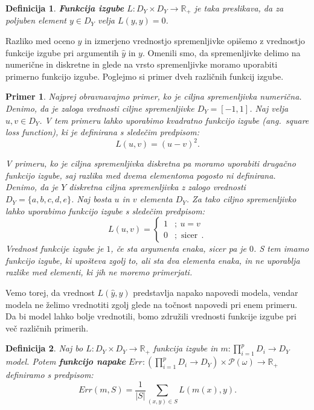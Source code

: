 \documentclass[12pt,a4paper]{article}
\newtheorem{definicija}{Definicija}
\newtheorem{primer}{Primer}
\begin{document}
\begin{definicija}
\textbf{Funkcija izgube} $L: D_Y \times D_Y \rightarrow \mathbb{R}_+$ je taka preslikava, da za poljuben element $y \in D_Y$ velja $L(y,y) = 0$.
\end{definicija}

Razliko med oceno $\hat{y}$ in izmerjeno vrednostjo spremenljivke opišemo z vrednostjo funkcije izgube pri argumentih $\hat{y}$ in $y$. Omenili smo, da spremenljivke delimo na numerične in diskretne in glede na vrsto spremenljivke moramo uporabiti primerno funkcijo izgube. Poglejmo si primer dveh različnih funkcij izgube.

\begin{primer}
Najprej obravnavajmo primer, ko je ciljna spremenljivka numerična. Denimo, da je zaloga vrednosti ciljne spremenljivke $D_Y = [-1,1]$. Naj velja $u, v \in  D_Y$. V tem primeru lahko uporabimo kvadratno funkcijo izgube (ang.~square loss function), ki je definirana s sledečim predpisom:
$$
L(u,v) = (u - v)^2.
$$

V primeru, ko je ciljna spremenljivka diskretna pa moramo uporabiti drugačno funkcijo izgube, saj razlika med dvema elementoma pogosto ni definirana. 
Denimo, da je $Y$ diskretna ciljna spremenljivka z zalogo vrednosti $D_Y = \{a,b,c,d,e\}$. 
Naj bosta $u$ in $v$ elementa $D_Y$. Za tako ciljno spremenljivko lahko uporabimo funkcijo izgube s sledečim predpisom:
\[
L(u,v) =
\begin{cases}
1 &;\ u= v \\
0 &; \text{ sicer}\ \ .
\end{cases}
\]
Vrednost funkcije izgube je $1$, če sta argumenta enaka, sicer pa je $0$. S tem imamo funkcijo izgube, ki upošteva zgolj to, ali sta dva elementa enaka, in ne uporablja razlike med elementi, ki jih ne moremo primerjati.
\end{primer}

Vemo torej, da vrednost $L(\hat{y}, y)$ predstavlja napako napovedi modela, vendar modela ne želimo vrednotiti zgolj glede na točnost napovedi pri enem primeru. Da bi model lahko bolje vrednotili, bomo združili vrednosti funkcije izgube pri več različnih primerih.

\begin{definicija}
Naj bo $L: D_Y \times D_Y \rightarrow \mathbb{R}_+$ funkcija izgube in $m: \prod_{i=1}^p D_i \rightarrow D_Y$ model. Potem \textbf{funkcijo napake} $Err: (\prod_{i=1}^p D_i \rightarrow D_Y) \times \mathcal P (\omega) \rightarrow \mathbb{R}_+$ definiramo s predpisom:
\[
Err(m,S) = \frac{1}{|S|} \sum_{(x,y) \in S} L(m(x),y).
\]
\end{definicija}
\end{document}
